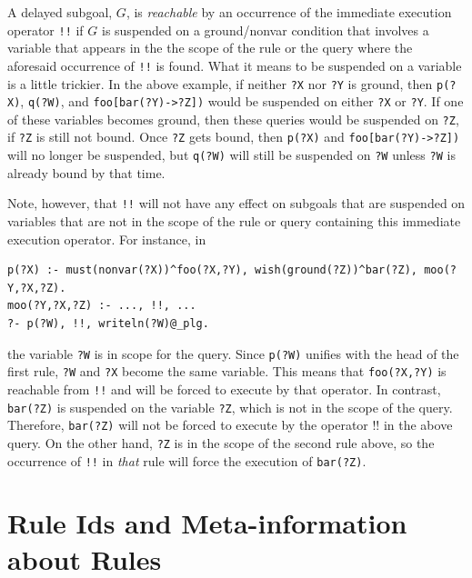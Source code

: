 \documentclass[11pt]{article}
\begin{document}
A delayed subgoal, $G$, is \emph{reachable} by an occurrence of
the immediate execution
operator \texttt{!!} 
if $G$ is suspended on a ground/nonvar condition that
involves a variable that appears in the the scope of the rule or the query
where the aforesaid occurrence of \texttt{!!} is found. 
What it means to be suspended on a variable is a little trickier.
In the above example, if neither \texttt{?X} nor \texttt{?Y} is ground,
then \texttt{p(?X)}, \texttt{q(?W)}, and \texttt{foo[bar(?Y)->?Z])} would
be suspended on either \texttt{?X} or \texttt{?Y}. If one of these
variables becomes ground, then these queries would be suspended on
\texttt{?Z}, if \texttt{?Z} is still not bound.  Once \texttt{?Z}  gets bound,
then \texttt{p(?X)} and \texttt{foo[bar(?Y)->?Z])} will no longer be
suspended, but \texttt{q(?W)} will still be suspended on \texttt{?W} unless
\texttt{?W} is already bound by that time.   

Note, however, that \texttt{!!} will not have any effect on subgoals that
are suspended on variables that are not in the scope of the rule or query
containing this
immediate execution operator. For instance, in
\begin{verbatim}
p(?X) :- must(nonvar(?X))^foo(?X,?Y), wish(ground(?Z))^bar(?Z), moo(?Y,?X,?Z).
moo(?Y,?X,?Z) :- ..., !!, ...
?- p(?W), !!, writeln(?W)@_plg.
\end{verbatim}
the variable \texttt{?W} is in scope for the query. Since
\texttt{p(?W)} unifies with the head of the first rule, \texttt{?W} and
\texttt{?X} become the same variable. This means that \texttt{foo(?X,?Y)}
is reachable from \texttt{!!} and will be forced to execute by that operator.
In contrast, \texttt{bar(?Z)} is suspended on the variable \texttt{?Z},
which is not in the scope of the query. Therefore, \texttt{bar(?Z)} will
not be forced to execute by the operator !! in the above query.   
On the other hand, \texttt{?Z} is in the scope of the second rule above, so
the occurrence of \texttt{!!} in \emph{that} rule will force the execution of
\texttt{bar(?Z)}.   


\section{Rule Ids and Meta-information about Rules}
\label{sec-rule-id}
\end{document}
